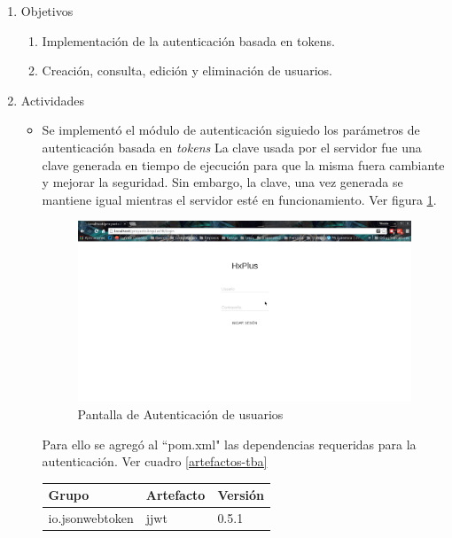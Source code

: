     \begin{enumerate}
        \item Objetivos
        \begin{enumerate}
            \item Implementación de la autenticación basada en tokens.
            \item Creación, consulta, edición y eliminación de usuarios.
        \end{enumerate}
        \item Actividades
        \begin{itemize}
            \item Se implementó el módulo de autenticación siguiedo los parámetros de autenticación basada en \textit{tokens}
            La clave usada por el servidor fue una clave generada en tiempo de ejecución para que la misma fuera cambiante y mejorar la seguridad. Sin embargo, la clave, una vez generada se mantiene igual mientras el servidor esté en funcionamiento. Ver figura \ref{Autenticación}.
            
            \begin{figure}[htbp!]
                \begin{center}
                    \includegraphics[width=.8\textwidth]{figures/p1}
                \end{center}
                \caption{Pantalla de Autenticación de usuarios}
                \label{Autenticación}
            \end{figure}
            
            Para ello se agregó al ``pom.xml" las dependencias requeridas para la autenticación. Ver cuadro \ref{artefactos-tba}
            
            \begin{table}[h!]
                
                \begin{center}
                    \begin{tabular}{|l|l|l|}\hline
                        Grupo & Artefacto & Versión \\\hline
                        io.jsonwebtoken & jjwt & 0.5.1 \\\hline
                    \end{tabular}
                \end{center}
                

\end{table}
\end{itemize}
\end{enumerate}
